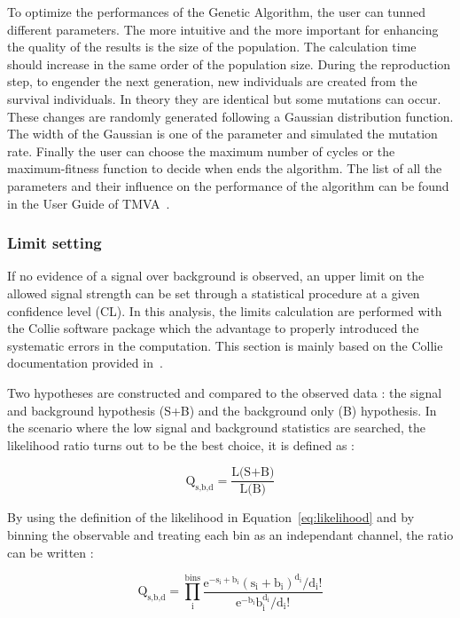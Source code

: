 \documentclass[main.tex]{subfiles}
\begin{document}
\NI To optimize the performances of the Genetic Algorithm, the user can tunned different parameters. The more intuitive and the more important for enhancing the quality of the results is the size of the population. The calculation time should increase in the same order of the population size. During the reproduction step, to engender the next generation, new individuals are created from the survival individuals. In theory they are identical but some mutations can occur. These changes are randomly generated following a Gaussian distribution function. The width of the Gaussian is one of the parameter and simulated the mutation rate. Finally the user can choose the maximum number of cycles or the maximum-fitness function to decide when ends the algorithm. The list of all the parameters and their influence on the performance of the algorithm can be found in the User Guide of TMVA~\cite{TMVA}.


\subsubsection{Limit setting}


\NI If no evidence of a signal over background is observed, an upper limit on the allowed signal strength can be set through a statistical procedure at a given confidence level (CL). In this analysis, the limits calculation are performed with the Collie software package which the advantage to properly introduced the systematic errors in the computation. This section is mainly based on the Collie documentation provided in~\cite{NLLR}.


\bigskip


\NI Two hypotheses are constructed and compared to the observed data : the signal and background hypothesis (S+B) and the background only (B) hypothesis. In the scenario where the low signal and background statistics are searched, the likelihood ratio turns out to be the best choice, it is defined as : 


\begin{equation}
\text{Q}_{\text{s,b,d}} = \frac{\text{L(S+B)}}{\text{L(B)}}
\end{equation}


\NI By using the definition of the likelihood in Equation~\ref{eq:likelihood} and by binning the observable and treating each bin as an independant channel, the ratio can be written : 


\bigskip


\begin{equation}
\text{Q}_{\text{s,b,d}} = \prod^{\text{bins}}_\text{i} \frac{\text{e}^{-\text{s}_\text{i} + \text{b}_\text{i}} (\text{s}_\text{i} + \text{b}_\text{i})^{\text{d}_\text{i}} / \text{d}_\text{i} \text{!} }{\text{e}^{-\text{b}_\text{i}} \text{b}_\text{i}^{\text{d}_\text{i}} / \text{d}_\text{i} \text{!}} 
\end{equation}
\end{document}
